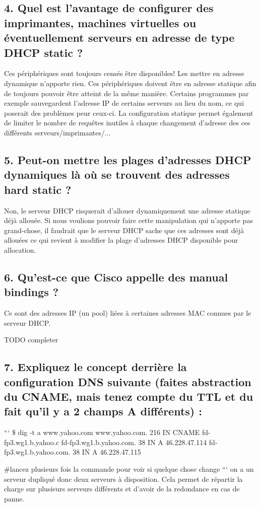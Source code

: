 \documentclass{article}
\begin{document}
\subsection*{4. Quel est l’avantage de configurer des imprimantes, machines virtuelles ou éventuellement serveurs en adresse de type DHCP static ?}
Ces périphériques sont toujours censés être disponibles! Les mettre en adresse dynamique n'apporte rien. Ces périphériques doivent être en adresse statique afin de toujours pouvoir être atteint de la même manière. Certains programmes par exemple sauvegardent l'adresse IP de certains serveurs au lieu du nom, ce qui poserait des problèmes peur ceux-ci. La configuration statique permet également de limiter le nombre de requêtes inutiles à chaque changement d'adresse des ces différents serveurs/imprimantes/...

\subsection*{5. Peut-on mettre les plages d’adresses DHCP dynamiques là où se trouvent des adresses hard static ?}
Non, le serveur DHCP risquerait d'allouer dynamiquement une adresse statique déjà allouée. Si nous voulions pouvoir faire cette manipulation qui n'apporte pas grand-chose, il faudrait que le serveur DHCP sache que ces adresses sont déjà allouées ce qui revient à modifier la plage d'adresses DHCP disponible pour allocation.

\subsection*{6. Qu’est-ce que Cisco appelle des manual bindings ?}
Ce sont des adresses IP (un pool) liées à certaines adresses MAC connues par le serveur DHCP.

TODO completer

\subsection*{7. Expliquez le concept derrière la configuration DNS suivante (faites abstraction du CNAME, mais tenez compte du TTL et du fait qu’il y a 2 champs A différents) :}
```
\$ dig -t a www.yahoo.com
www.yahoo.com.            216   IN    CNAME   fd-fp3.wg1.b.yahoo.c
fd-fp3.wg1.b.yahoo.com.   38    IN    A       46.228.47.114
fd-fp3.wg1.b.yahoo.com.   38    IN    A       46.228.47.115

\#lancez plusieurs fois la commande pour voir si quelque chose change
```
on a un serveur dupliqué donc deux serveurs à disposition. Cela permet de répartir la charge sur plusieurs serveurs différents et d'avoir de la redondance en cas de panne.
\end{document}
